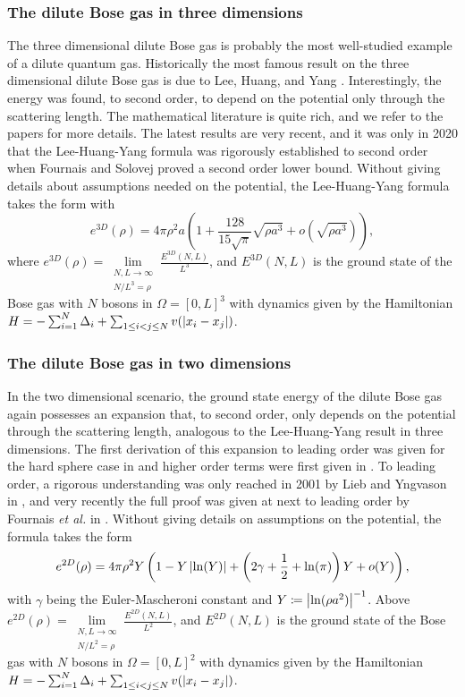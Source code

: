 \subsubsection{The dilute Bose gas in three dimensions}
The three dimensional dilute Bose gas is probably the most well-studied example of a dilute quantum gas. Historically the most famous result on the three dimensional dilute Bose gas is due to Lee, Huang, and Yang \cite{lee1957eigenvalues}. Interestingly, the energy was found, to second order, to depend on the potential only through the scattering length.
The mathematical literature is quite rich, and we refer to the papers \cite{dyson1957ground,lieb1998ground,lieb1999ground,lieb2001ground,yau2009second,basti2021new,fournais2020energy,fournais2021energy} for more details. The latest results are very recent, and it was only in 2020 that the Lee-Huang-Yang formula was rigorously established to second order when Fournais and Solovej proved a second order lower bound. Without giving details about assumptions needed on the potential, the Lee-Huang-Yang formula takes the form with \begin{equation}
e^{3D}(\rho)=4\pi \rho^2 a\left(1+\frac{128}{15\sqrt{\pi}}\sqrt{\rho a^3}+o\left(\sqrt{\rho a^3}\right)\right),
\end{equation}
where $ e^{3D}(\rho)=\lim\limits_{\substack{N,L\to\infty\\ N/L^3=\rho}}\frac{E^{3D}(N,L)}{L^3} $, and $ E^{3D}(N,L) $ is the ground state of the Bose gas with $ N $ bosons in $ \Omega=[0,L]^3 $ with dynamics given by the Hamiltonian $ H=-\sum_{i=1}^{N}\Delta_i+\sum_{1\leq i<j\leq N} v(\left\lvert x_i-x_j \right\rvert) $.

\subsubsection{The dilute Bose gas in two dimensions}
In the two dimensional scenario, the ground state energy of the dilute Bose gas again possesses an expansion that, to second order, only depends on the potential through the scattering length, analogous to the Lee-Huang-Yang result in three dimensions. The first derivation of this expansion to leading order was given for the hard sphere case in \cite{schick1971two} and higher order terms were first given in \cite{hines1978hard}. To leading order, a rigorous understanding was only reached in 2001 by Lieb and Yngvason in \cite{lieb2001ground}, and very recently the full proof was given at next to leading order by Fournais \emph{et al.} in \cite{fournais2022ground}. Without giving details on assumptions on the potential, the formula takes the form
\begin{equation}
e^{2D}(\rho)=4\pi \rho^2 Y\left(1-Y\left\lvert \ln(Y) \right\rvert+\left(2\gamma+\frac{1}{2}+\ln(\pi)\right)Y+o(Y)\right),
\end{equation}
with $ \gamma $ being the Euler-Mascheroni constant and $ Y\coloneqq\left\lvert \ln(\rho a^2) \right\rvert^{-1} $. Above $ e^{2D}(\rho)=\lim\limits_{\substack{N,L\to\infty\\ N/L^2=\rho}}\frac{E^{2D}(N,L)}{L^2} $, and $ E^{2D}(N,L) $ is the ground state of the Bose gas with $ N $ bosons in $ \Omega=[0,L]^2 $ with dynamics given by the Hamiltonian $ H=-\sum_{i=1}^{N}\Delta_i+\sum_{1\leq i<j\leq N} v(\left\lvert x_i-x_j \right\rvert) $.
